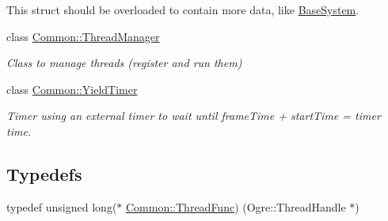 \begin{DoxyCompactItemize}
\begin{DoxyCompactList}
This struct should be overloaded to contain more data, like \hyperlink{class_common_1_1_base_system}{Base\+System}. \end{DoxyCompactList}\item 
class \hyperlink{class_common_1_1_thread_manager}{Common\+::\+Thread\+Manager}
\begin{DoxyCompactList}\small\item\em Class to manage threads (register and run them) \end{DoxyCompactList}\item 
class \hyperlink{class_common_1_1_yield_timer}{Common\+::\+Yield\+Timer}
\begin{DoxyCompactList}\small\item\em Timer using an external timer to wait until frame\+Time + start\+Time = timer time. \end{DoxyCompactList}\end{DoxyCompactItemize}
\subsection*{Typedefs}
\begin{DoxyCompactItemize}
\item 
typedef unsigned long($\ast$ \hyperlink{group___common_ga30c64a033e17f4a1fd985caa74ccf922}{Common\+::\+Thread\+Func}) (Ogre\+::\+Thread\+Handle $\ast$)
\end{DoxyCompactItemize}
